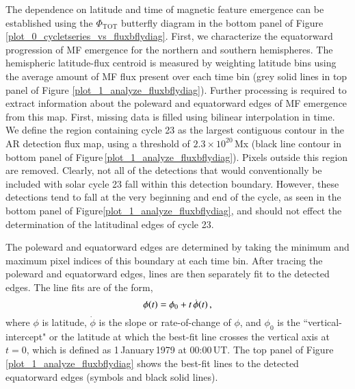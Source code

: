 \documentclass[namedreferences]{solarphysics}
\begin{document}
\begin{article}
The dependence on latitude and time of magnetic feature emergence can be established using the $\Phi_{\mathrm{TOT}}$ butterfly diagram in the bottom panel of Figure \ref{plot_0_cycletseries_vs_fluxbflydiag}. First, we characterize the equatorward progression of MF emergence for the northern and southern hemispheres. The hemispheric latitude-flux centroid is measured by weighting latitude bins using the average amount of MF flux present over each time bin (grey solid lines in top panel of Figure \ref{plot_1_analyze_fluxbflydiag}). 
Further processing is required to extract information about the poleward and equatorward edges of MF emergence from this map. First, missing data is filled using bilinear interpolation in time. We define the region containing cycle 23 as the largest contiguous contour in the AR detection flux map, using a threshold of $2.3\times10^{20}$\,Mx (black line contour in bottom panel of Figure\,\ref{plot_1_analyze_fluxbflydiag}). Pixels outside this region are removed. Clearly, not all of the detections that would conventionally be included with solar cycle 23 fall within this detection boundary. However, these detections tend to fall at the very beginning and end of the cycle, as seen in the bottom panel of Figure\ref{plot_1_analyze_fluxbflydiag}, and should not effect the determination of the latitudinal edges of cycle 23.

The poleward and equatorward edges are determined by taking the minimum and maximum pixel indices of this boundary at each time bin. After tracing the poleward and equatorward edges, lines are then separately fit to the detected edges. 
The line fits are of the form,
\begin{equation}
\phi(t)=\phi_{0}+t\,\dot{\phi}(t) \mbox{\,,}
\end{equation}
where $\phi$ is latitude, $\dot{\phi}$ is the slope or rate-of-change of $\phi$, and $\phi_{0}$ is the ``vertical-intercept" or the latitude at which the best-fit line crosses the vertical axis at $t=0$, which is defined as 1\,January\,1979 at 00:00\,UT. %
 The top panel of Figure\,\ref{plot_1_analyze_fluxbflydiag} shows the best-fit lines to the detected equatorward edges (symbols and black solid lines).


\end{article}
\end{document}
